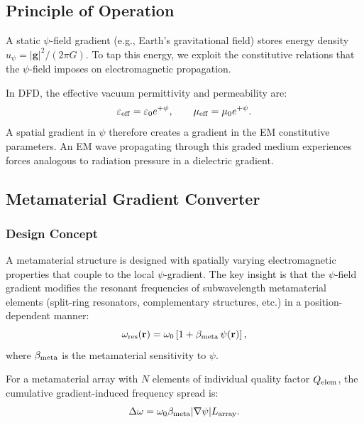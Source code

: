 \documentclass[aps,prd,twocolumn,showpacs,preprintnumbers,superscriptaddress,nofootinbib]{revtex4-2}
\begin{document}
\subsection{Principle of Operation}\label{sec:gradient-principle}

A static $\psi$-field gradient (e.g., Earth's gravitational field) stores
energy density $u_\psi = |\mathbf{g}|^2/(2\pi G)$.  To tap this energy,
we exploit the constitutive relations that the $\psi$-field imposes on
electromagnetic propagation.

In DFD, the effective vacuum permittivity and permeability are:
\begin{equation}\label{eq:constitutive}
\varepsilon_{\rm eff} = \varepsilon_0 e^{+\psi}, \qquad
\mu_{\rm eff} = \mu_0 e^{+\psi}.
\end{equation}
A spatial gradient in $\psi$ therefore creates a gradient in the EM
constitutive parameters.  An EM wave propagating through this graded
medium experiences forces analogous to radiation pressure in a
dielectric gradient.

\subsection{Metamaterial Gradient Converter}\label{sec:metamaterial}

\subsubsection{Design Concept}

A metamaterial structure is designed with spatially varying electromagnetic
properties that couple to the local $\psi$-gradient.  The key insight is
that the $\psi$-field gradient modifies the resonant frequencies of
subwavelength metamaterial elements (split-ring resonators, complementary
structures, etc.) in a position-dependent manner:
\begin{equation}
\omega_{\rm res}(\mathbf{r}) = \omega_0\left[1 + \beta_{\rm meta}\,\psi(\mathbf{r})\right],
\end{equation}
where $\beta_{\rm meta}$ is the metamaterial sensitivity to $\psi$.

For a metamaterial array with $N$ elements of individual quality factor
$Q_{\rm elem}$, the cumulative gradient-induced frequency spread is:
\begin{equation}
\Delta\omega = \omega_0\beta_{\rm meta}|\nabla\psi|L_{\rm array}.
\end{equation}
\end{document}

